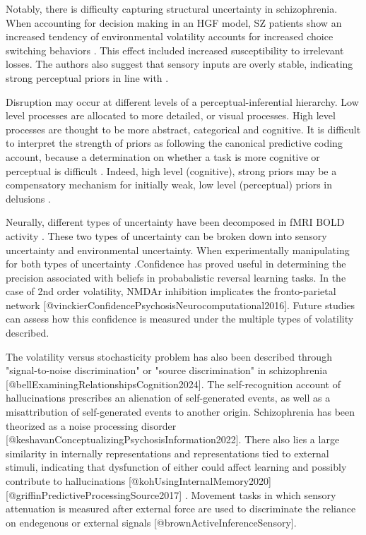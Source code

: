 \documentclass{article}
\begin{document}
Notably, there is difficulty capturing structural uncertainty in schizophrenia. When accounting for decision making in an HGF model, SZ patients show an increased tendency of environmental volatility accounts for increased choice switching behaviors \citep{deserno2020volatility}. This effect included increased susceptibility to irrelevant losses. The authors also suggest that sensory inputs are overly stable, indicating strong perceptual priors in line with \citep{powers2017pavlovian}.

Disruption may occur at different levels of a perceptual-inferential hierarchy. Low level processes are allocated to more detailed, or visual processes. High level processes are thought to be more abstract, categorical and cognitive. It is difficult to interpret the strength of priors as following the canonical predictive coding account, because a determination on whether a task is more cognitive or perceptual is difficult \citep{stuke2019delusion, schmack2017enhanced, wengler2020distinct}. Indeed, high level (cognitive), strong priors may be a compensatory mechanism for initially weak, low level (perceptual) priors in delusions \citep{schmack2013delusion, schmack2017enhanced}.

Neurally, different types of uncertainty have been decomposed in fMRI BOLD activity \citep{mcguire2014functionally}. These two types of uncertainty can be broken down into sensory uncertainty and environmental uncertainty. When experimentally manipulating for both types of uncertainty \citep{fritsch2023sensory}.Confidence has proved useful in determining the precision associated with beliefs in probabalistic reversal learning tasks. In the case of 2nd order volatility, NMDAr inhibition implicates the fronto-parietal network [@vinckierConfidencePsychosisNeurocomputational2016]. Future studies can assess how this confidence is measured under the multiple types of volatility described. 

The volatility versus stochasticity problem has also been described through "signal-to-noise discrimination" or "source discrimination" in schizophrenia [@bellExaminingRelationshipsCognition2024]. The self-recognition account of hallucinations prescribes an alienation of self-generated events, as well as a misattribution of self-generated events to another origin. Schizophrenia has been theorized as a noise processing disorder [@keshavanConceptualizingPsychosisInformation2022]. There also lies a large similarity in internally representations and representations tied to external stimuli, indicating that dysfunction of either could affect learning and possibly contribute to hallucinations [@kohUsingInternalMemory2020] [@griffinPredictiveProcessingSource2017] . Movement tasks in which sensory attenuation is measured after external force are used to discriminate the reliance on endegenous or external signals [@brownActiveInferenceSensory].
\end{document}
